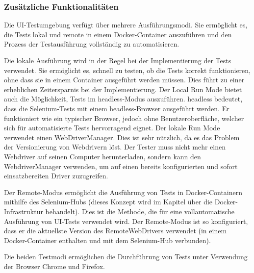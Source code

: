 \subsubsection{Zusätzliche Funktionalitäten}

Die UI-Testumgebung verfügt über mehrere Ausführungsmodi.
Sie ermöglicht es, die Tests lokal und remote in einem Docker-Container
auszuführen und den Prozess der Testausführung
vollständig zu automatisieren.


Die lokale Ausführung wird in der Regel bei der Implementierung
der Tests verwendet. Sie ermöglicht es, schnell zu testen, ob die
Tests korrekt funktionieren, ohne dass sie in einem Container
ausgeführt werden müssen. Dies führt zu einer erheblichen Zeitersparnis
bei der Implementierung. Der Local Run Mode bietet auch die
Möglichkeit, Tests im \gls{headless}-Modus auszuführen. \gls{headless} bedeutet,
dass die Selenium-Tests mit einem \gls{headless}-Browser ausgeführt werden.
Er funktioniert wie ein typischer Browser, jedoch ohne
Benutzeroberfläche, welcher sich für automatisierte Tests hervorragend eignet.
Der lokale Run Mode verwendet einen WebDriverManager. Dies ist sehr
nützlich, da es das Problem der Versionierung von Webdrivern löst.
Der Tester muss nicht mehr einen Webdriver auf seinen Computer
herunterladen, sondern kann den WebdriverManager verwenden, um
auf einen bereits konfigurierten und sofort einsatzbereiten Driver
zuzugreifen.

Der Remote-Modus ermöglicht die Ausführung von Tests in
Docker-Containern mithilfe des Selenium-Hubs (dieses Konzept wird
im Kapitel über die Docker-Infrastruktur behandelt). Dies ist die
Methode, die für eine vollautomatische Ausführung von UI-Tests
verwendet wird. Der Remote-Modus ist so konfiguriert, dass er die
aktuellste Version des RemoteWebDrivers verwendet (in einem
Docker-Container enthalten und mit dem Selenium-Hub verbunden).



Die beiden Testmodi ermöglichen die Durchführung von Tests unter
Verwendung der Browser Chrome und Firefox.